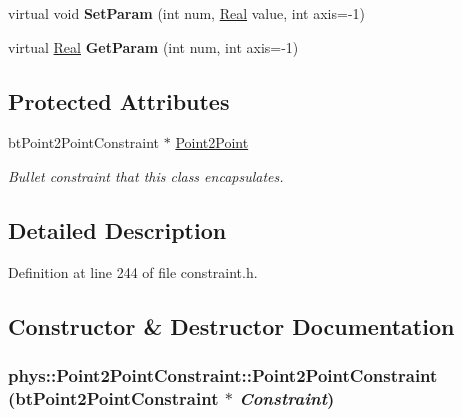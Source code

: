 \begin{DoxyCompactItemize}
\item 
\hypertarget{classphys_1_1Point2PointConstraint_ad6f28464773121658e54e8bde2a14704}{
virtual void {\bfseries SetParam} (int num, \hyperlink{namespacephys_af7eb897198d265b8e868f45240230d5f}{Real} value, int axis=-\/1)}
\label{da/dfb/classphys_1_1Point2PointConstraint_ad6f28464773121658e54e8bde2a14704}

\item 
\hypertarget{classphys_1_1Point2PointConstraint_a0f58e2b57a463fe6fe44e7b3192fc3b7}{
virtual \hyperlink{namespacephys_af7eb897198d265b8e868f45240230d5f}{Real} {\bfseries GetParam} (int num, int axis=-\/1)}
\label{da/dfb/classphys_1_1Point2PointConstraint_a0f58e2b57a463fe6fe44e7b3192fc3b7}

\end{DoxyCompactItemize}
\subsection*{Protected Attributes}
\begin{DoxyCompactItemize}
\item 
\hypertarget{classphys_1_1Point2PointConstraint_aa58b7fd9fe368c72d5bc5e1990bdf593}{
btPoint2PointConstraint $\ast$ \hyperlink{classphys_1_1Point2PointConstraint_aa58b7fd9fe368c72d5bc5e1990bdf593}{Point2Point}}
\label{da/dfb/classphys_1_1Point2PointConstraint_aa58b7fd9fe368c72d5bc5e1990bdf593}

\begin{DoxyCompactList}\small\item\em Bullet constraint that this class encapsulates. \item\end{DoxyCompactList}\end{DoxyCompactItemize}


\subsection{Detailed Description}


Definition at line 244 of file constraint.h.



\subsection{Constructor \& Destructor Documentation}
\hypertarget{classphys_1_1Point2PointConstraint_a73c530c760f31032e23955567f634978}{
\subsubsection[{Point2PointConstraint}]{\setlength{\rightskip}{0pt plus 5cm}phys::Point2PointConstraint::Point2PointConstraint (btPoint2PointConstraint $\ast$ {\em Constraint})}}
\label{da/dfb/classphys_1_1Point2PointConstraint_a73c530c760f31032e23955567f634978}


